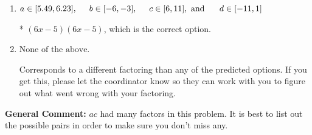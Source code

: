 \documentclass{extbook}[14pt]
\begin{document}
\begin{enumerate}
{\begin{enumerate}[label=\Alph*.]
 $(12x -5)(3x -5)$, which corresponds to associating some factor of a to c.
\item \( a \in [5.49, 6.23], \hspace*{5mm} b \in [-6, -3], \hspace*{5mm} c \in [6, 11], \text{ and } \hspace*{5mm} d \in [-11, 1] \)

* $(6x -5)(6x -5)$, which is the correct option.
\item \( \text{None of the above.} \)

 Corresponds to a different factoring than any of the predicted options. If you get this, please let the coordinator know so they can work with you to figure out what went wrong with your factoring.
\end{enumerate}

\textbf{General Comment:} $ac$ had many factors in this problem. It is best to list out the possible pairs in order to make sure you don't miss any.
}
\end{enumerate}
\end{document}
